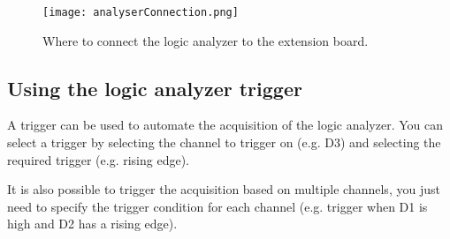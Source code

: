 \begin{figure}[h]
	\centering
	\texttt{[image: analyserConnection.png]}
	\caption{Where to connect the logic analyzer to the extension board. }
	\label{fig:analyserConnection}
\end{figure}




\subsection{Using the logic analyzer trigger}

A trigger can be used to automate the acquisition of the logic analyzer. You can select a trigger by selecting the channel to trigger on (e.g. D3) and selecting the required trigger (e.g. rising edge). 

It is also possible to trigger the acquisition based on multiple channels, you just need to specify the trigger condition for each channel (e.g. trigger when D1 is high and D2 has a rising edge). 

{}









